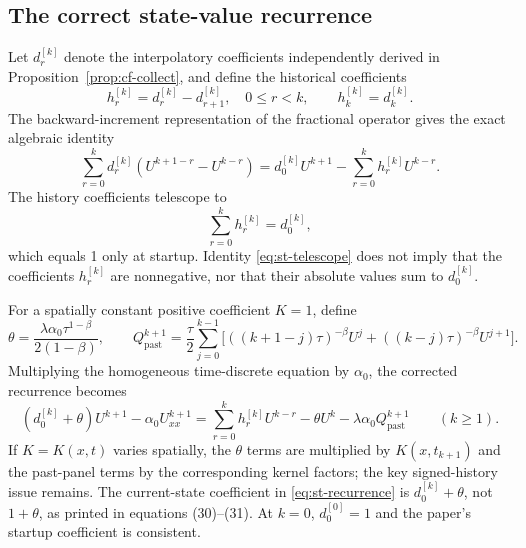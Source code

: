 \documentclass[11pt]{amsart}
\numberwithin{equation}{section}
\theoremstyle{remark}
\begin{document}
\subsection{The correct state-value recurrence}
Let $d_r^{[k]}$ denote the interpolatory coefficients independently derived
in Proposition~\ref{prop:cf-collect}, and define the historical coefficients
\begin{equation}\label{eq:st-history}
h_r^{[k]}=d_r^{[k]}-d_{r+1}^{[k]},\quad 0\leq r<k,
\qquad h_k^{[k]}=d_k^{[k]}.
\end{equation}
The backward-increment representation of the fractional operator gives the
exact algebraic identity
\begin{equation}\label{eq:st-state}
\sum_{r=0}^kd_r^{[k]}(U^{k+1-r}-U^{k-r})
=d_0^{[k]}U^{k+1}-\sum_{r=0}^kh_r^{[k]}U^{k-r}.
\end{equation}
The history coefficients telescope to
\begin{equation}\label{eq:st-telescope}
\sum_{r=0}^kh_r^{[k]}=d_0^{[k]},
\end{equation}
which equals 1 only at startup. Identity \eqref{eq:st-telescope} does not
imply that the coefficients $h_r^{[k]}$ are nonnegative, nor that their
absolute values sum to $d_0^{[k]}$.

For a spatially constant positive coefficient $K=1$, define
\[
\theta=\frac{\lambda\alpha_0\tau^{1-\beta}}{2(1-\beta)},\qquad
Q_{\mathrm{past}}^{k+1}=\frac\tau2\sum_{j=0}^{k-1}
\bigl[((k+1-j)\tau)^{-\beta}U^j+((k-j)\tau)^{-\beta}U^{j+1}\bigr].
\]
Multiplying the homogeneous time-discrete equation by $\alpha_0$, the
corrected recurrence becomes
\begin{equation}\label{eq:st-recurrence}
(d_0^{[k]}+\theta)U^{k+1}-\alpha_0U_{xx}^{k+1}
=\sum_{r=0}^kh_r^{[k]}U^{k-r}-\theta U^k
-\lambda\alpha_0Q_{\mathrm{past}}^{k+1}\qquad(k\geq1).
\end{equation}
If $K=K(x,t)$ varies spatially, the $\theta$ terms are
multiplied by $K(x,t_{k+1})$ and the past-panel terms by the
corresponding kernel factors; the key signed-history issue remains.
The current-state coefficient in \eqref{eq:st-recurrence} is
$d_0^{[k]}+\theta$, not $1+\theta$, as printed in equations (30)--(31).
At $k=0$, $d_0^{[0]}=1$ and the paper's startup coefficient is consistent.
\end{document}
